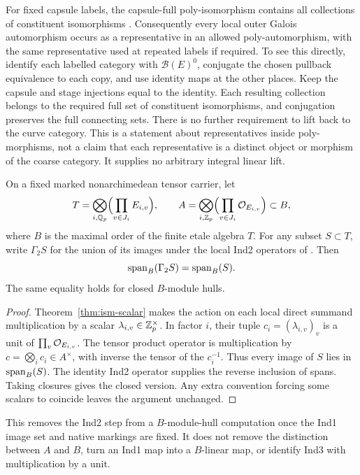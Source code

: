 For fixed capsule labels, the capsule-full poly-isomorphism contains
all collections of constituent isomorphisms
\cite[\S0, pp.~33--34; Definition~4.10]{IUT1}. Consequently every
local outer Galois automorphism occurs as a representative in an
allowed poly-automorphism, with the same representative used at repeated
labels if required. To see this directly, identify each labelled
category with $\mathcal B(E)^0$, conjugate the chosen pullback
equivalence to each copy, and use identity maps at the other places.
Keep the capsule and stage injections equal to the identity. Each
resulting collection belongs to the required full set of constituent
isomorphisms, and conjugation preserves the full connecting sets.
There is no further requirement to lift back to the curve category.
This is a statement about representatives inside poly-morphisms, not
a claim that each representative is a distinct object or morphism of
the coarse category. It supplies no arbitrary integral linear lift.

\begin{proposition}
\label{prop:ind2-hull-equality}
On a fixed marked nonarchimedean tensor carrier, let
\[
 T=\bigotimes_{i,\mathbb Q_p}\Bigl(\prod_{v\in J_i}E_{i,v}\Bigr),
 \qquad
 A=\bigotimes_{i,\mathbb Z_p}\Bigl(\prod_{v\in J_i}\mathcal O_{E_{i,v}}\Bigr)
 \subset B,
\]
where $B$ is the maximal order of the finite etale algebra $T$.
For any subset $S\subset T$, write $\Gamma_2S$ for the union of its
images under the local Ind2 operators of \cite[Theorem~3.11(i)]{IUT3}.
Then
\[
 \operatorname{span}_B(\Gamma_2S)=\operatorname{span}_B(S).
\]
The same equality holds for closed $B$-module hulls.
\end{proposition}
\begin{proof}
Theorem~\ref{thm:ism-scalar} makes the action on each local direct
summand multiplication by a scalar $\lambda_{i,v}\in\mathbb Z_p^\times$.
In factor $i$, their tuple $c_i=(\lambda_{i,v})_v$ is a unit of
$\prod_v\mathcal O_{E_{i,v}}$. The tensor product operator is multiplication
by $c=\bigotimes_i c_i\in A^\times$, with inverse the tensor of the
$c_i^{-1}$. Thus every image of $S$ lies in $\operatorname{span}_B(S)$.
The identity Ind2 operator supplies the reverse inclusion of spans.
Taking closures gives the closed version. Any extra convention forcing
some scalars to coincide leaves the argument unchanged.
\end{proof}

This removes the Ind2 step from a $B$-module-hull computation once
the Ind1 image set and native markings are fixed. It does not remove
the distinction between $A$ and $B$, turn an Ind1 map into a
$B$-linear map, or identify Ind3 with multiplication by a unit.

